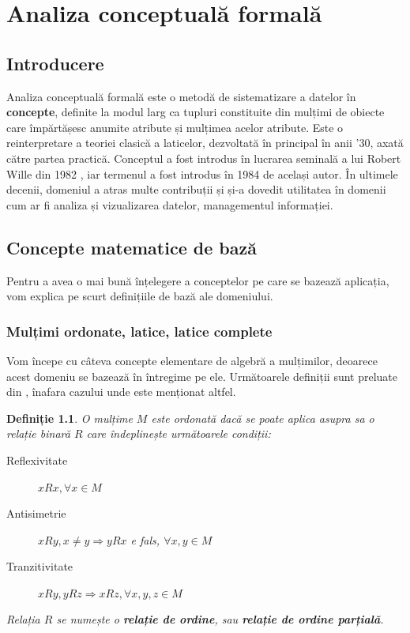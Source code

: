 \documentclass[12pt, a4paper, twoside, romanian]{teza-upb}
\newtheorem{defn}{Definiție}
\begin{document}
\chapter{Analiza conceptuală formală}
\label{chapter:1}
  \section{Introducere}
    Analiza conceptuală formală este o metodă de sistematizare a datelor în \textbf{concepte}, definite la modul larg ca tupluri constituite din mulțimi de obiecte care împărtășesc anumite atribute și mulțimea acelor atribute. Este o reinterpretare a teoriei clasică a laticelor, dezvoltată în principal în anii '30, axată către partea practică. Conceptul a fost introdus în lucrarea seminală a lui Robert Wille din 1982 \cite{wille:1982}, iar termenul a fost introdus în 1984 de același autor. În ultimele decenii, domeniul a atras multe contribuții și și-a dovedit utilitatea în domenii cum ar fi analiza și vizualizarea datelor, managementul informației.
  \section{Concepte matematice de bază}
    Pentru a avea o mai bună înțelegere a conceptelor pe care se bazează aplicația, vom explica pe scurt definițiile de bază ale domeniului.
    \subsection{Mulțimi ordonate, latice, latice complete}
    Vom începe cu câteva concepte elementare de algebră a mulțimilor, deoarece acest domeniu se bazează în întregime pe ele. Următoarele definiții sunt preluate din \cite{Ganter:1997:FCA:550737}, înafara cazului unde este menționat altfel.
    \begin{defn}
      O mulțime $M$ este ordonată dacă se poate aplica asupra sa o relație binară $R$ care îndeplinește următoarele condiții:
      \begin{description}
        \item [Reflexivitate] $xRx, \forall x \in M$
        \item [Antisimetrie] $xRy, x \neq y \Rightarrow yRx$ e fals, $\forall x, y \in M$
        \item [Tranzitivitate] $xRy, yRz \Rightarrow xRz, \forall x, y, z \in M$
      \end{description}
      Relația $R$ se numește o \textbf{relație de ordine}, sau \textbf{relație de ordine parțială}.
    \end{defn}
\end{document}
